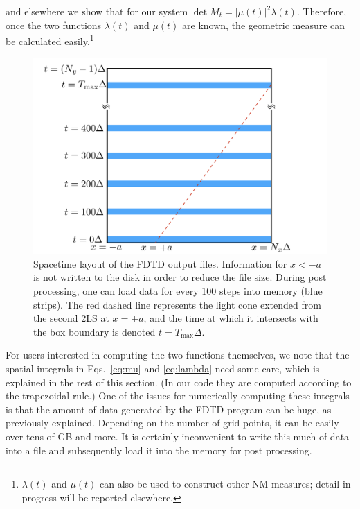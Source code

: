 \documentclass[12pt,letter,onecolumn,notitlepage]{article}
\begin{document}
\begin{appendices}
\begin{equation}
\label{eq: geo measure}
\end{equation}
and elsewhere \cite{FangNM17} we show that for our system $\det M_t = |\mu(t)|^2 \lambda(t)$. 
Therefore, once the two functions $\lambda(t)$ and $\mu(t)$ are known, the geometric measure can be calculated easily.\footnote{$\lambda(t)$ and $\mu(t)$ can also be used to construct other NM measures; detail in progress will be reported elsewhere.}


\begin{figure}[!hbtp]
	\centering
	\includegraphics[scale=0.5]{file_process_schematic}
	\caption{Spacetime layout of the FDTD output files. Information for $x<-a$ is not written to the disk in order to reduce the file size. During post processing, one can load data for every 100 steps into memory (blue strips). The red dashed line represents the light cone extended from the second 2LS at $x=+a$, and the time at which it intersects with the box boundary is denoted $t=T_\text{max}\Delta$.}
	\label{fig: file processing}
\end{figure}

For users interested in computing the two functions themselves, we note that the spatial integrals in Eqs.~\eqref{eq:mu} and \eqref{eq:lambda} need some care, which is explained in the rest of this section. 
(In our code they are computed according to the trapezoidal rule.)
One of the issues for numerically computing these integrals is that the amount of data generated by the FDTD program can be huge, as previously explained. Depending on the number of grid points, it can be easily over tens of GB and more. It is certainly inconvenient to write this much of data into a file and subsequently load it into the memory for post processing.



\end{appendices}
\end{document}
